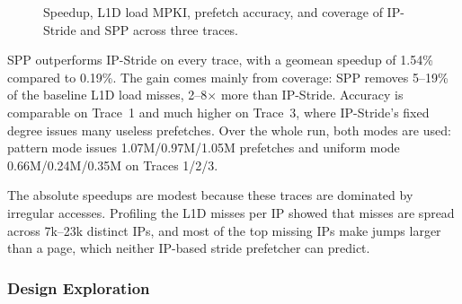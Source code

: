 \documentclass[11pt,a4paper]{article}
\begin{document}
\begin{figure}[H]
    \vspace{1em}

    \hfill

    \caption{Speedup, L1D load MPKI, prefetch accuracy, and coverage
    of IP-Stride and SPP across three traces.}
    \label{fig:spp-results}
\end{figure}


  SPP outperforms IP-Stride on every trace, with a geomean speedup of
  1.54\% compared to 0.19\%. The gain comes mainly from coverage: SPP
  removes 5--19\% of the baseline L1D load misses, 2--8$\times$ more than
  IP-Stride. Accuracy is comparable on Trace~1 and much higher on
  Trace~3, where IP-Stride's fixed degree issues many useless prefetches.
  Over the whole run, both modes are used: pattern mode issues
  1.07M/0.97M/1.05M prefetches and uniform mode 0.66M/0.24M/0.35M on
  Traces 1/2/3.

  The absolute speedups are modest because these traces are dominated by
  irregular accesses. Profiling the L1D misses per IP showed that misses
  are spread across 7k--23k distinct IPs, and most of the top missing IPs
  make jumps larger than a page, which neither IP-based stride prefetcher can
  predict.
  \subsubsection{Design Exploration}
\end{document}
